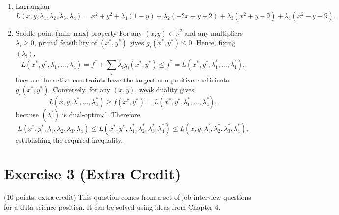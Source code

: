 \documentclass{article}
\begin{document}
\begin{enumerate}
\item  Lagrangian  
      \[
      L(x,y,\lambda_{1},\lambda_{2},\lambda_{3},\lambda_{4})
      =x^{2}+y^{2}
      +\lambda_{1}(1-y)
      +\lambda_{2}(-2x-y+2)
      +\lambda_{3}(x^{2}+y-9)
      +\lambda_{4}(x^{2}-y-9).
      \]

\item  Saddle‑point (min–max) property  
      For any \((x,y)\in\mathbb R^{2}\) and any multipliers \(\lambda_{i}\ge 0\),
      primal feasibility of \((x^{*},y^{*})\) gives \(g_{i}(x^{*},y^{*})\le 0\).
      Hence, fixing \((\lambda_{i})\),
      \[
      L(x^{*},y^{*},\lambda_{1},\dots,\lambda_{4})
      =f^{*}+\sum_{i}\lambda_{i}g_{i}(x^{*},y^{*})
      \le f^{*}=L(x^{*},y^{*},\lambda_{1}^{*},\dots,\lambda_{4}^{*}),
      \]
      because the active constraints have the largest non‑positive
      coefficients \(g_{i}(x^{*},y^{*})\).
      Conversely, for any \((x,y)\),
      weak duality gives  
      \[
      L(x,y,\lambda_{1}^{*},\dots,\lambda_{4}^{*})
      \ge f(x^{*},y^{*}) = L(x^{*},y^{*},\lambda_{1}^{*},\dots,\lambda_{4}^{*}),
      \]
      because \((\lambda_{i}^{*})\) is dual‑optimal.  
      Therefore  
      \[
      L(x^{*},y^{*},\lambda_{1},\lambda_{2},\lambda_{3},\lambda_{4})
      \le
      L(x^{*},y^{*},\lambda_{1}^{*},\lambda_{2}^{*},\lambda_{3}^{*},\lambda_{4}^{*})
      \le
      L(x,y,\lambda_{1}^{*},\lambda_{2}^{*},\lambda_{3}^{*},\lambda_{4}^{*}),
      \]
      establishing the required inequality.
\end{enumerate}


\newpage

\section*{Exercise 3 (Extra Credit)}
(10 points, extra credit)
This question comes from a set of job interview questions for a data science position. It can be solved using ideas from Chapter 4.
\end{document}
